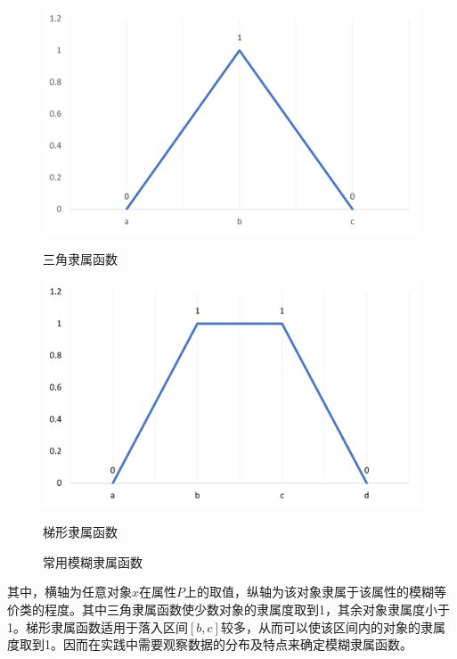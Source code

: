   \begin{figure}[htb]
    \centering
    \begin{minipage}[t]{0.49\linewidth}
      \centering
      \includegraphics[width=\linewidth]{figs/membership_tri.png}
      \caption{三角隶属函数}
      \label{fig:membership_tri}
    \end{minipage}
    \hfill
    \begin{minipage}[t]{0.49\linewidth}
      \centering
      \includegraphics[width=\linewidth]{figs/membership_tixing.png}
      \caption{梯形隶属函数}
      \label{fig:membership_tixing}
    \end{minipage}
    \caption{常用模糊隶属函数}
    \label{fig:membership_function}
  \end{figure}

其中，横轴为任意对象$x$在属性$P$上的取值，纵轴为该对象隶属于该属性的模糊等价类的程度。其中三角隶属函数使少数对象的隶属度取到1，其余对象隶属度小于1。梯形隶属函数适用于落入区间$[b,c]$较多，从而可以使该区间内的对象的隶属度取到1。因而在实践中需要观察数据的分布及特点来确定模糊隶属函数\cite{基于粗糙集和模糊粗糙集的属性约简研究}。

